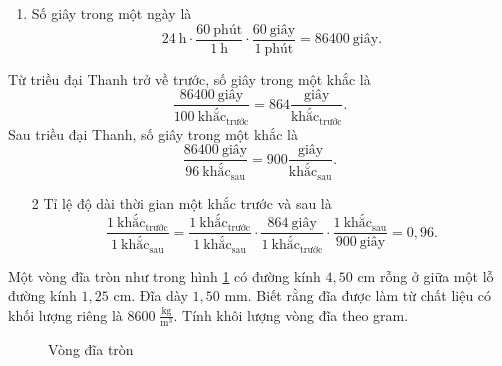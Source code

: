 \documentclass[a4paper, titlepage, openany]{book}
\newcounter{exercise}
\newcounter{solution}
\begin{document}
\solution
\begin{enumerate}
   \item Số giây trong một ngày là $$24\ \text{h} \cdot \frac{60\ \text{phút}}{1\ \text{h}} \cdot \frac{60\ \text{giây}}{1\ \text{phút}} = 86400\ \text{giây}.$$
\end{enumerate}
Từ triều đại Thanh trở về trước, số giây trong một khắc là $$\frac{86400\ \text{giây}}{100\ \text{khắc}_{\text{trước}}} = \boxed{864 \frac{\text{giây}}{\text{khắc}_{\text{trước}}}}.$$
Sau triều đại Thanh, số giây trong một khắc là $$\frac{86400\ \text{giây}}{96\ \text{khắc}_{\text{sau}}} = \boxed{900 \frac{\text{giây}}{\text{khắc}_{\text{sau}}}}.$$
\begin{enumerate}
   \item[2] Tỉ lệ độ dài thời gian một khắc trước và sau là $$\frac{1\ \text{khắc}_{\text{trước}}}{1\ \text{khắc}_{\text{sau}}} = \frac{1\ \text{khắc}_{\text{trước}}}{1\ \text{khắc}_{\text{sau}}}\cdot \frac{864\ \text{giây}}{1\ \text{khắc}_{\text{trước}}}\cdot\frac{1\ \text{khắc}_{\text{sau}}}{900\ \text{giây}}=\boxed{0{,}96}.$$
\end{enumerate}

\exercise Một vòng đĩa tròn như trong hình \ref{fig:vong_dia} có đường kính $4{,}50$ cm rỗng ở giữa một lỗ đường kính $1{,}25$ cm. Đĩa dày $1{,}50$ mm. Biết rằng đĩa được làm từ chất liệu có khối lượng riêng là $8600\;\frac{\text{kg}}{\text{m}^3}$. Tính khôi lượng vòng đĩa theo gram.

\begin{figure}
   \centering
   \caption{Vòng đĩa tròn}
   \label{fig:vong_dia}
\end{figure}
\end{document}

